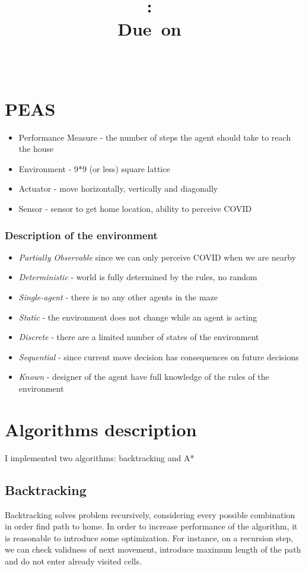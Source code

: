 \documentclass{article}
\title{
    \vspace{2in}
    \textmd{\textbf{\hmwkClass:\ \hmwkTitle}}\\
    \normalsize\vspace{0.1in}\small{Due\ on\ \hmwkDueDate}\\
    \vspace{0.1in}\large{\textit{\hmwkClassInstructor\ \hmwkClassTime}}
    \vspace{3in}\\\text{BS19-02}
}
\author{\hmwkAuthorName}
\date{}
\newcommand{\C}{COVID }
\begin{document}
\maketitle

\pagebreak
\section{PEAS}
\begin{itemize}
    \item Performance Measure - the number of steps the agent should take to reach the house
    \item Environment - 9*9 (or less) square lattice
    \item Actuator - move horizontally, vertically and diagonally
    \item Sensor - sensor to get home location, ability to perceive \C
\end{itemize}
\subsubsection{Description of the environment}
\begin{itemize}
    \item \textit{Partially Observable} since we can only perceive \C when we are nearby
    \item \textit{Deterministic} - world is fully determined by the rules, no random
    \item \textit{Single-agent} - there is no any other agents in the maze
    \item \textit{Static} - the environment does not change while an agent is acting
    \item \textit{Discrete} - there are a limited number of states of the environment
    \item \textit{Sequential} - since current move decision has consequences on future decisions
    \item \textit{Known} - designer of the agent have full knowledge of the rules of the environment
\end{itemize}

\newpage
\section{Algorithms description}
I implemented two algorithms: backtracking and A*
\subsection{Backtracking}
Backtracking solves problem recursively, considering every possible combination in order find path to home.
In order to increase performance of the algorithm, it is reasonable to introduce some optimization. For instance, on a recursion step, we can check validness of next movement, introduce maximum length of the path and do not enter already visited cells.
\end{document}
